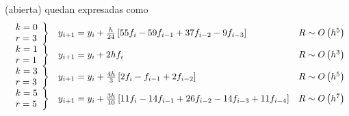 \documentclass[spanish,titlepage,11pt]{article}
\begin{document}
(abierta) quedan expresadas como
\[%
\begin{array}
[c]{lll}%
\left.
\begin{array}
[c]{l}%
k=0\\
r=3
\end{array}
\right\}  & y_{i+1}=y_{i}+\frac{h}{24}\left[  55f_{i}-59f_{i-1}+37f_{i-2}%
-9f_{i-3}\right]  & R\sim O\left(  h^{5}\right) \\
\left.
\begin{array}
[c]{l}%
k=1\\
r=1
\end{array}
\right\}  & y_{i+1}=y_{i}+2hf_{i} & R\sim O\left(  h^{3}\right) \\
\left.
\begin{array}
[c]{l}%
k=3\\
r=3
\end{array}
\right\}  & y_{i+1}=y_{i}+\frac{4h}{3}\left[  2f_{i}-f_{i-1}+2f_{i-2}\right]
& R\sim O\left(  h^{5}\right) \\
\left.
\begin{array}
[c]{l}%
k=5\\
r=5
\end{array}
\right\}  & y_{i+1}=y_{i}+\frac{3h}{10}\left[  11f_{i}-14f_{i-1}%
+26f_{i-2}-14f_{i-3}+11f_{i-4}\right]  & R\sim O\left(  h^{7}\right)
\end{array}
\]
\end{document}
